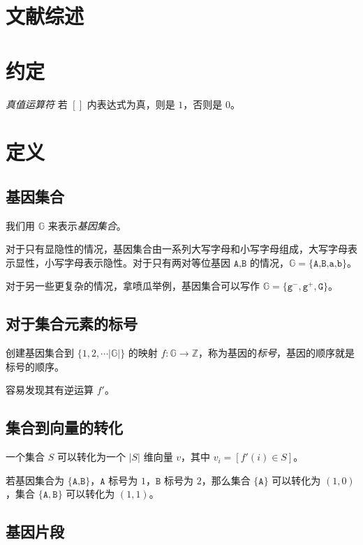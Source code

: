 \documentclass{article}
\begin{document}
\section{文献综述}

\section{约定}

\textsl{真值运算符} \qquad 若 $[]$ 内表达式为真，则是 $1$，否则是 $0$。

\section{定义}


\subsection{基因集合}

我们用 $\mathbb{G}$ 来表示\textsl{基因集合}。

对于只有显隐性的情况，基因集合由一系列大写字母和小写字母组成，大写字母表示显性，小写字母表示隐性。对于只有两对等位基因 $\texttt{A,B}$ 的情况，$\mathbb{G}=\{\texttt{A,B,a,b}\}$。

对于另一些更复杂的情况，拿喷瓜举例，基因集合可以写作 $\mathbb{G}=\{\texttt{g}^{-},\texttt{g}^{+},\texttt{G}\}$。

\subsection{对于集合元素的标号}

创建基因集合到 $\{1,2,\cdots |\mathbb{G}|\}$ 的映射 $f:\mathbb{G} \to \mathbb{Z}$，称为基因的\textsl{标号}，基因的顺序就是标号的顺序。

容易发现其有逆运算 $f'$。

\subsection{集合到向量的转化}

一个集合 $S$ 可以转化为一个 $|S|$ 维向量 $v$，其中 $v_i=[f'(i) \in S]$。

若基因集合为 $\{\texttt{A,B}\}$，$\texttt{A}$ 标号为 $1$，$\texttt{B}$ 标号为 $2$，那么集合 $\{\texttt{A}\}$ 可以转化为 $(1,0)$，集合 $\{\texttt{A},\texttt{B}\}$ 可以转化为 $(1,1)$。

\subsection{基因片段}
\end{document}
